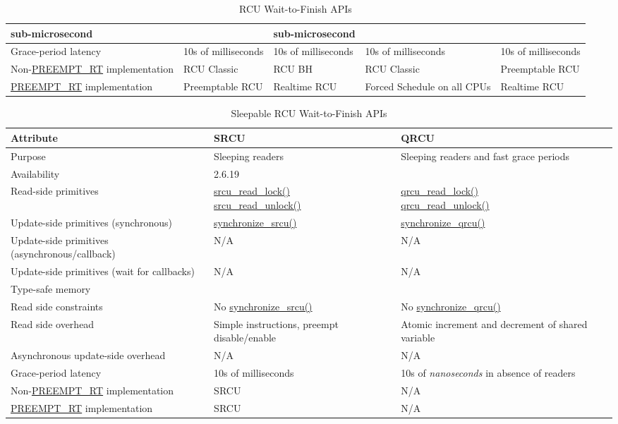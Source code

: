 \begin{table*}[p]
\begin{center}
\begin{tabular}{p{1.1in}|p{1.0in}|p{1.1in}|p{1.0in}|p{1.0in}}
	sub-microsecond &
	    &
	        sub-microsecond \\
\hline
Grace-period latency &
    10s of milliseconds &
	10s of milliseconds &
	    10s of milliseconds &
	        10s of milliseconds \\
\hline
Non-\url{PREEMPT_RT} implementation &
    RCU Classic &
	RCU BH &
	    RCU Classic &
	        Preemptable RCU \\
\hline
\url{PREEMPT_RT} implementation &
    Preemptable RCU &
	Realtime RCU &
	    Forced Schedule on all CPUs &
	        Realtime RCU \\
\end{tabular}
\end{center}
\caption{RCU Wait-to-Finish APIs}
\label{tab:defer:RCU Wait-to-Finish APIs}
\end{table*}

\begin{table*}[p]
\begin{center}
\scriptsize
\begin{tabular}{p{1.1in}|p{1.5in}|p{1.5in}}
Attribute &
    SRCU &
	QRCU \\
\hline
\hline
Purpose &
    Sleeping readers &
	Sleeping readers and fast grace periods \\
\hline
Availability &
    2.6.19 &
	\\
\hline
Read-side primitives &
    { \raggedright
      \url{srcu_read_lock()} \\
      \url{srcu_read_unlock()} } &
	{ \raggedright
	  \url{qrcu_read_lock()} \\
	  \url{qrcu_read_unlock()} } \\
\hline
{ Update-side primitives (synchronous) } &
    \url{synchronize_srcu()} &
	\url{synchronize_qrcu()} \\
\hline
{ Update-side primitives (asynchronous/callback) } &
    N/A &
	N/A \\
\hline
{ Update-side primitives (wait for callbacks) } &
    N/A &
	N/A \\
\hline
Type-safe memory &
    &
	\\
\hline
Read side constraints &
    No \url{synchronize_srcu()} &
	No \url{synchronize_qrcu()} \\
\hline
Read side overhead &
    Simple instructions, preempt disable/enable &
	Atomic increment and decrement of shared variable \\
\hline
Asynchronous update-side overhead &
    N/A &
	N/A \\
\hline
Grace-period latency &
    10s of milliseconds &
	10s of \emph{nanoseconds} in absence of readers \\
\hline
Non-\url{PREEMPT_RT} implementation &
    SRCU &
	N/A \\
\hline
\url{PREEMPT_RT} implementation &
    SRCU &
	N/A \\
\end{tabular}
\end{center}
\caption{Sleepable RCU Wait-to-Finish APIs}
\label{tab:defer:Sleepable RCU Wait-to-Finish APIs}
\end{table*}

